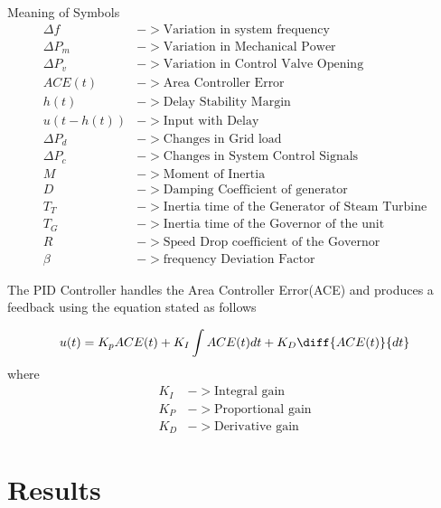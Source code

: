\documentclass[journal]{IEEEtran}
\begin{document}
Meaning of Symbols
\begin{align}
  \Delta f &-> \text{Variation in system frequency}  \\
  \Delta P_m &-> \text{Variation in Mechanical Power} \\
  \Delta P_v &-> \text{Variation in Control Valve Opening} \\
  ACE(t) &-> \text{Area Controller Error} \\
  h(t) &-> \text{Delay Stability Margin} \\
  u(t-h(t)) &-> \text{Input with Delay} \\
  \Delta P_d &-> \text{Changes in Grid load} \\
  \Delta P_c &-> \text{Changes in System Control  Signals} \\
  M &-> \text{Moment of Inertia} \\
  D &-> \text{Damping Coefficient of generator} \\
  T_T &-> \text{Inertia time of the Generator of Steam Turbine} \\
  T_G &-> \text{Inertia time of the Governor of the unit } \\
  R &-> \text{Speed Drop coefficient of the Governor} \\
  \beta &-> \text{frequency Deviation Factor} 
\end{align} 

The PID Controller handles the Area Controller Error(ACE) and produces a feedback 
using the equation stated as follows

\begin{equation}
  u(t)=K_pACE(t) + K_I\int ACE(t)dt + K_D \diff{ACE(t)}{dt}
\end{equation}
where
\begin{align}
  K_I &-> \text{Integral gain}\\
  K_P &-> \text{Proportional gain} \\
K_D &->\text{Derivative gain}
\end{align}
\section{Results}
\end{document}
